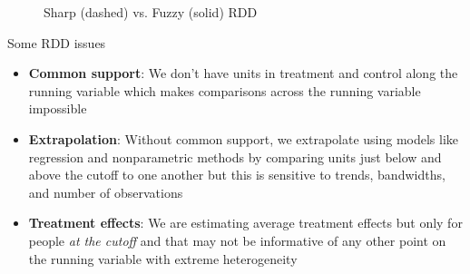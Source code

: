 \documentclass{beamer}
\begin{document}
\begin{frame}[plain]
\begin{figure}
\centering
{}
\caption{Sharp (dashed) vs. Fuzzy (solid) RDD}
\end{figure}

	

\end{frame}

\begin{frame}{Some RDD issues}

\begin{itemize}
\item \textbf{Common support}: We don't have units in treatment and control along the running variable which makes comparisons across the running variable impossible
\item \textbf{Extrapolation}: Without common support, we extrapolate using models like regression and nonparametric methods by comparing units just below and above the cutoff to one another but this is sensitive to trends, bandwidths, and number of observations
\item \textbf{Treatment effects}: We are estimating average treatment effects but only for people \emph{at the cutoff} and that may not be informative of any other point on the running variable with extreme heterogeneity
\end{itemize}

\end{frame}
\end{document}
